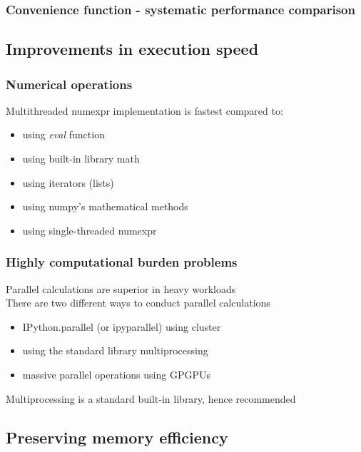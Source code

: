 \documentclass{beamer}
\begin{document}
\begin{frame}
\frametitle{Convenience function - systematic performance comparison}
\end{frame}

\subsection{Improvements in execution speed}

\begin{frame}
\frametitle{Numerical operations}
Multithreaded numexpr implementation is fastest compared to:\\[3mm]
\begin{itemize}
	\item using \emph{eval} function
	\item using built-in library math
	\item using iterators (lists)
	\item using numpy's mathematical methods
	\item using single-threaded numexpr
\end{itemize}
\end{frame}

\begin{frame}
\frametitle{Highly computational burden problems}
Parallel calculations are superior in heavy workloads\\
There are two different ways to conduct parallel calculations
\begin{itemize}
	\item IPython.parallel (or ipyparallel) using cluster
	\item using the standard library multiprocessing
	\item massive parallel operations using GPGPUs
\end{itemize}
Multiprocessing is a standard built-in library, hence recommended
\end{frame}


\subsection{Preserving memory efficiency}
\end{document}
